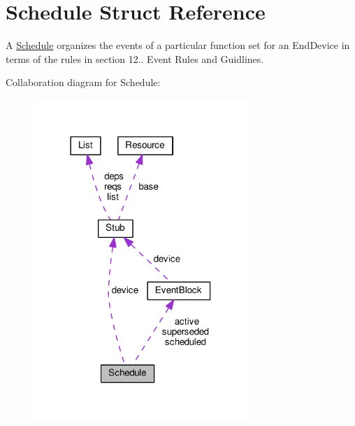 \hypertarget{structSchedule}{}\section{Schedule Struct Reference}
\label{structSchedule}


A \hyperlink{structSchedule}{Schedule} organizes the events of a particular function set for an End\+Device in terms of the rules in section 12.. Event Rules and Guidlines.  




Collaboration diagram for Schedule\+:\nopagebreak
\begin{figure}[H]
\begin{center}
\leavevmode
\includegraphics[width=230pt]{structSchedule__coll__graph}
\end{center}
\end{figure}

